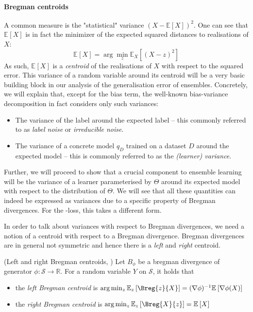 \documentclass[
    a4paper, %
	fontsize=10pt, %
	twoside=false, %
]{kaobook}
\begin{document}
\paragraph{Bregman centroids} A common measure is the "statistical" variance $(X - \mathbb{E} \left[ X \right])^2$. One can see that $\mathbb{E}_{}\left[ X \right]$ is in fact the minimizer of the expected squared distances to realisations of $X$:
$$
\mathbb{E}_{}\left[ X \right]  = \arg\min_{z} \mathbb{E}_{X}\left[ (X - z)^2 \right] 
$$
As such, $\mathbb{E}_{}\left[ X \right]$ is a \textit{centroid} of the realisations of $X$ with respect to the squared error. 
This variance of a random variable around its centroid will be a very basic building block in our analysis of the generalisation error of ensembles. Concretely, we will explain that, except for the bias term, the well-known bias-variance decomposition in fact considers only such variances:
\begin{itemize}
\item The variance of the label around the expected label -- this commonly referred to as \textit{label noise} or \textit{irreducible noise}.
\item The variance of a concrete model $q_{D}$ trained on a dataset $D$ around the expected model -- this is commonly referred to as the \textit{(learner) variance}.
\end{itemize}
Further, we will proceed to show that a crucial component to ensemble learning will be the variance of a learner parameterised by $\Theta$ around its expected model with respect to the distribution of $\Theta$.
We will see that all these quantities can indeed be expressed as variances due to a specific property of Bregman divergences. For the \zeroone-loss, this takes a different form.

In order to talk about variances with respect to Bregman divergences, we need a notion of a centroid with respect to a Bregman divergence. Bregman divergences are in general not symmetric and hence there is a \textit{left} and \textit{right} centroid.

\begin{lemma} (Left and right Bregman centroids, \cite{pfau_GeneralizedBiasVarianceDecomposition_})
    Let $B_{\phi}$ be a bregman divergence of generator $\phi: \mathcal{S} \to \mathbb{R}$. For a random variable $Y$ on $\mathcal{S}$, it holds that
\begin{itemize}
    \item the \textit{left Bregman centroid} is $\arg\min_{z}  \mathbb{E}_{z}\left[ \Breg{z}{X}\right] = (\nabla \phi)^{-1} \mathbb{E}_{}\left[ \nabla \phi(X) \right]$
    \item the \textit{right Bregman centroid} is $\arg \min_z \mathbb{E}_{z}\left[ \Breg{X}{z}  \right] = \mathbb{E}_{}\left[ X \right]$
\end{itemize}
\end{lemma}
\end{document}
